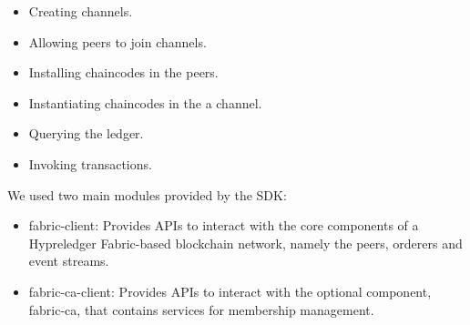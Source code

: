 \begin{itemize}
   \item Creating channels.
   \item Allowing peers to join channels. 
   \item Installing chaincodes in the peers.
   \item Instantiating chaincodes in the a channel. 
   \item Querying the ledger. 
   \item Invoking transactions. 
\end{itemize}  
\bigskip
We used two main modules provided by the SDK: 

 \begin{itemize}
  \item fabric-client: Provides APIs to interact with the core components of a Hypreledger Fabric-based blockchain network, namely the peers, orderers and event streams.
  \item fabric-ca-client: Provides APIs to interact with the optional component, fabric-ca, that contains services for membership management.
\end{itemize} 
\bigskip

